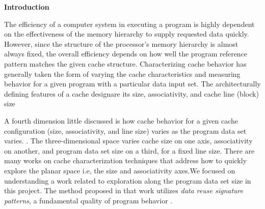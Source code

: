 \documentclass[12pt]{article}
\begin{document}
{\fontsize{20pt}{24.0pt}\selectfont \textbf{Introduction}\par}\par


\vspace{\baselineskip}

\vspace{\baselineskip}
\begin{adjustwidth}{0.0in}{0.04in}
{\fontsize{10pt}{12.0pt}\selectfont \textcolor[HTML]{333333}{The efficiency of a computer system in executing a program is highly dependent on the effectiveness of the memory hierarchy to supply requested data quickly. However, since the structure of the processor's memory hierarchy is almost always fixed, the overall efficiency depends on how well the program reference pattern matches the given cache structure. Characterizing cache behavior has generally taken the form of varying the cache characteristics and measuring behavior for a given program with a particular data input set. The architecturally defining features of a cache designare its size, associativity, and cache line (block) size}\par}\par

\end{adjustwidth}


\vspace{\baselineskip}
\begin{adjustwidth}{0.0in}{0.06in}
{\fontsize{10pt}{12.0pt}\selectfont \textcolor[HTML]{333333}{A fourth dimension little discussed is how cache behavior for a given cache configuration (size, associativity, and line size) varies as the program data set varies. . The three-dimensional space varies cache size on one axis, associativity on another, and program data set size on a third, for a fixed line size. There are many works on cache characterization techniques that address how to quickly explore the planar space i.e, the size and associativity axes.We focused on understanding a work related to exploration along the program data set size in this project. The method proposed in that work utilizes \textit{data reuse signature patterns}, a fundamental quality of program behavior .}\par}\par

\end{adjustwidth}
\end{document}
